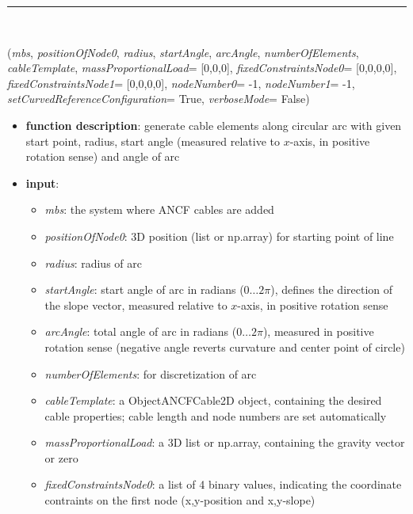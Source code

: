 \begin{itemize}[leftmargin=1.4cm]
\begin{itemize}[leftmargin=1.4cm]
\begin{itemize}[leftmargin=1.4cm]
\begin{itemize}[leftmargin=0.5cm]
\begin{itemize}[leftmargin=1.4cm]
%
\noindent\rule{8cm}{0.75pt}\vspace{1pt} \\ 
\begin{flushleft}
\label{sec:beams:GenerateCircularArcANCFCable2D}
({\it mbs}, {\it positionOfNode0}, {\it radius}, {\it startAngle}, {\it arcAngle}, {\it numberOfElements}, {\it cableTemplate}, {\it massProportionalLoad}= [0,0,0], {\it fixedConstraintsNode0}= [0,0,0,0], {\it fixedConstraintsNode1}= [0,0,0,0], {\it nodeNumber0}= -1, {\it nodeNumber1}= -1, {\it setCurvedReferenceConfiguration}= True, {\it verboseMode}= False)
\end{flushleft}
\setlength{\itemindent}{0.7cm}
\begin{itemize}[leftmargin=0.7cm]
\item[--]
{\bf function description}: generate cable elements along circular arc with given start point, radius, start angle (measured relative to $x$-axis, in positive rotation sense) and angle of arc
\item[--]
{\bf input}: \vspace{-6pt}
\begin{itemize}[leftmargin=1.2cm]
\setlength{\itemindent}{-0.7cm}
\item[]{\it mbs}: the system where ANCF cables are added
\item[]{\it positionOfNode0}: 3D position (list or np.array) for starting point of line
\item[]{\it radius}: radius of arc
\item[]{\it startAngle}: start angle of arc in radians  ($0 \ldots 2 \pi$), defines the direction of the slope vector, measured relative to $x$-axis, in positive rotation sense
\item[]{\it arcAngle}: total angle of arc in radians ($0 \ldots 2 \pi$), measured in positive rotation sense (negative angle reverts curvature and center point of circle)
\item[]{\it numberOfElements}: for discretization of arc
\item[]{\it cableTemplate}: a ObjectANCFCable2D object, containing the desired cable properties; cable length and node numbers are set automatically
\item[]{\it massProportionalLoad}: a 3D list or np.array, containing the gravity vector or zero
\item[]{\it fixedConstraintsNode0}: a list of 4 binary values, indicating the coordinate contraints on the first node (x,y-position and x,y-slope)

\end{itemize}
\end{itemize}
\end{itemize}
\end{itemize}
\end{itemize}
\end{itemize}
\end{itemize}

